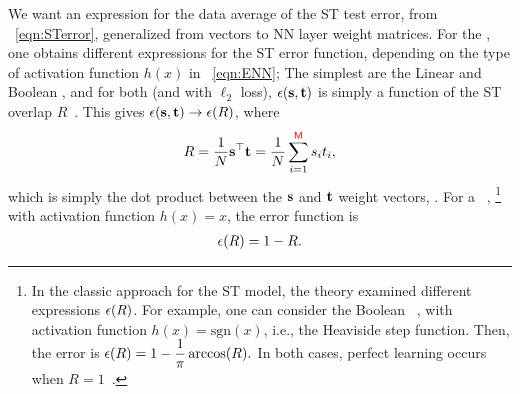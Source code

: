 We want an expression for the data average of the ST test error, from \EQN~\ref{eqn:STerror}, generalized from \Perceptron vectors to NN layer weight matrices.
For the \Perceptron, one obtains different expressions for the ST error function, depending on 
the type of activation function $h(x)$ in \EQN~\ref{eqn:ENN};
The simplest are the Linear and Boolean \Perceptrons, and
for both (and with $\ell_2$ loss),
 $\epsilon({\mathbf{s}},{\mathbf{t}})$ is simply a function of the ST overlap $R$~\cite{SST92}.
This gives $\epsilon({\mathbf{s}}, {\mathbf{t}} )\rightarrow\epsilon(R)$, where
\begin{align}
  \label{eqn:Rdef}
R=\frac{1}{N}{\mathbf{s}}^{\top}{\mathbf{t}}=\frac{1}{N}\sum_{i=1}^{{\color{red}\sf{M}}}s_{i}t_{i},
\end{align}
which is simply the dot product between the  \Student ${\mathbf{s}}$ and \Teacher ${\mathbf{t}}$ weight vectors, .
For a \LinearPerceptron~\cite{SST92},%
\footnote{In the classic approach for the ST model, the theory examined different expressions $\epsilon(R)$.
For example, one can consider the  Boolean \Perceptron~\cite{SST92,Ros62}, with activation function $h(x)=\mbox{sgn}(x)$, 
i.e., the Heaviside step function. Then, the error is
$
\epsilon(R)=1 - \dfrac{1}{\pi}\arccos(R).
$
In both cases, perfect learning occurs when $R=1$~\cite{SST92}.
}
with activation function $h(x)=x$,  the error function is
\begin{align}
\epsilon(R)=1-R  .
\label{eqn:LinearPerceptronError}
\end{align}








